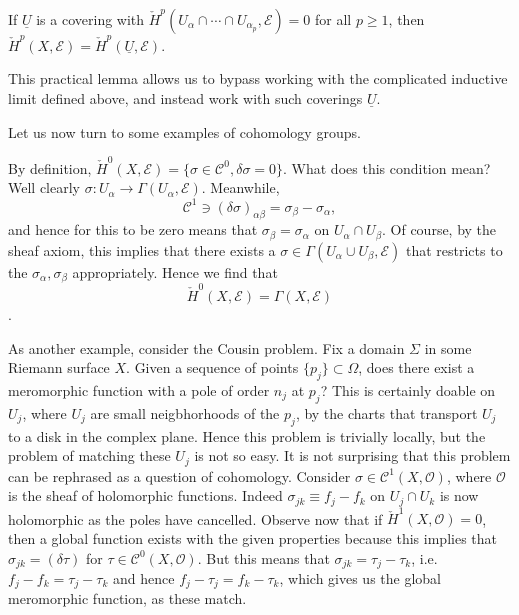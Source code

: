 \documentclass{../mathnotes}
\begin{document}
\begin{lem}[Leray]
    If $\underline{U}$ is a covering with $\check H^p(U_\alpha\cap\cdots\cap U_{\alpha_p},\mathcal{E})=0$ for all $p\geq 1$,
    then $\check H^p(X,\mathcal{E})=\check H^p(\underline{U},\mathcal{E})$.
\end{lem}

This practical lemma allows us to bypass working with the complicated inductive limit defined above, and instead work
with such coverings $\underline{U}$.

Let us now turn to some examples of cohomology groups.
\begin{exmp}
    By definition, $\check H^0(X,\mathcal{E})=\{\sigma\in\mathcal{C}^0, \delta\sigma=0\}$. What does this condition mean?
    Well clearly $\sigma:U_\alpha\to \Gamma(U_\alpha,\mathcal{E})$. Meanwhile,
    \[\mathcal{C}^1\ni (\delta\sigma)_{\alpha\beta}=\sigma_\beta-\sigma_\alpha,\]
    and hence for this to be zero means that $\sigma_\beta=\sigma_\alpha$ on $U_\alpha\cap U_\beta$.
    Of course, by the sheaf axiom, this implies that there exists a $\sigma\in\Gamma(U_\alpha\cup U_\beta,\mathcal{E})$
    that restricts to the $\sigma_\alpha,\sigma_\beta$ appropriately. Hence we find that
    \[\check H^0(X,\mathcal{E})=\Gamma(X,\mathcal{E})\].

    As another example, consider the Cousin problem. Fix a domain $\Sigma$ in some Riemann surface $X$.  Given a sequence
    of points $\{p_j\}\subset\Omega$, does there exist a meromorphic function with a pole of order $n_j$
    at $p_j$? This is certainly doable on $U_j$, where $U_j$ are small neigbhorhoods of the $p_j$, by the charts
    that transport $U_j$ to a disk in the complex plane. Hence this problem is trivially locally, but the
    problem of matching these $U_j$ is not so easy. It is not surprising that this problem can be rephrased
    as a question of cohomology. Consider $\sigma\in\mathcal{C}^1(X,\mathcal{O})$, where $\mathcal{O}$ is the
    sheaf of holomorphic functions. Indeed $\sigma_{jk}\equiv f_j-f_k$ on $U_j\cap U_k$ is now holomorphic
    as the poles have cancelled. Observe now that if $\check H^1(X,\mathcal{O})=0$, then a global function exists
    with the given properties because this implies that $\sigma_{jk}=(\delta\tau)$ for $\tau\in\mathcal{C}^0(X,\mathcal{O})$.
    But this means that $\sigma_{jk}=\tau_j-\tau_k$, i.e. $f_j-f_k=\tau_j-\tau_k$ and hence $f_j-\tau_j=f_k-\tau_k$,
    which gives us the global meromorphic function, as these match.


\end{exmp}
\end{document}
